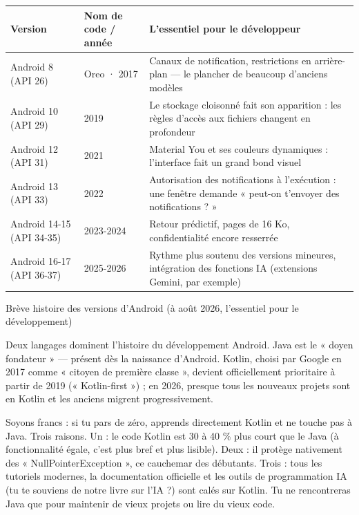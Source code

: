 \begin{center}
\begin{tabularx}{\linewidth}{|X|X|X|}
\hline
\textbf{Version} & \textbf{Nom de code / année} & \textbf{L'essentiel pour le développeur} \tabularnewline
\hline
Android 8 (API 26) & Oreo · 2017 & Canaux de notification, restrictions en arrière-plan — le plancher de beaucoup d'anciens modèles \tabularnewline
Android 10 (API 29) & 2019 & Le stockage cloisonné fait son apparition : les règles d'accès aux fichiers changent en profondeur \tabularnewline
Android 12 (API 31) & 2021 & Material You et ses couleurs dynamiques : l'interface fait un grand bond visuel \tabularnewline
Android 13 (API 33) & 2022 & Autorisation des notifications à l'exécution : une fenêtre demande « peut-on t'envoyer des notifications ? » \tabularnewline
Android 14-15 (API 34-35) & 2023-2024 & Retour prédictif, pages de 16 Ko, confidentialité encore resserrée \tabularnewline
Android 16-17 (API 36-37) & 2025-2026 & Rythme plus soutenu des versions mineures, intégration des fonctions IA (extensions Gemini, par exemple) \tabularnewline
\hline
\end{tabularx}
\end{center}

\begin{center}\small\color{gray}Brève histoire des versions d'Android (à août 2026, l'essentiel pour le développement)\end{center}


Deux langages dominent l'histoire du développement Android. Java est le « doyen fondateur » — présent dès la naissance d'Android. Kotlin, choisi par Google en 2017 comme « citoyen de première classe », devient officiellement prioritaire à partir de 2019 (« Kotlin-first ») ; en 2026, presque tous les nouveaux projets sont en Kotlin et les anciens migrent progressivement.

Soyons francs : si tu pars de zéro, apprends directement Kotlin et ne touche pas à Java. Trois raisons. Un : le code Kotlin est 30 à 40 \% plus court que le Java (à fonctionnalité égale, c'est plus bref et plus lisible). Deux : il protège nativement des « NullPointerException », ce cauchemar des débutants. Trois : tous les tutoriels modernes, la documentation officielle et les outils de programmation IA (tu te souviens de notre livre sur l'IA ?) sont calés sur Kotlin. Tu ne rencontreras Java que pour maintenir de vieux projets ou lire du vieux code.

